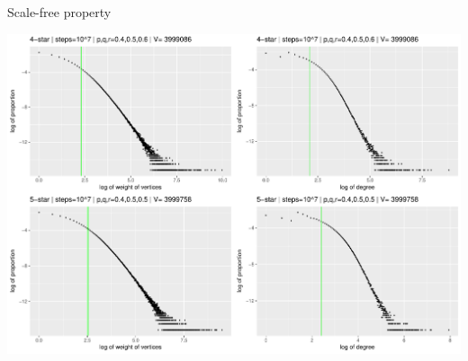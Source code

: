 \begin{block}{Scale-free property}\small

  
  \centering
  \includegraphics[width=0.8\linewidth]{./fig/csilldist4.pdf}
\end{block}
